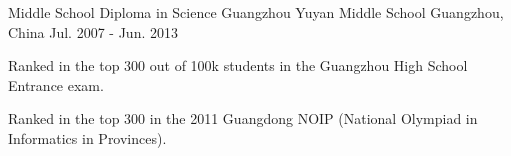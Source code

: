 \begin{cventries}
  \cventry
    {Middle School Diploma in Science} %
    {Guangzhou Yuyan Middle School} %
    {Guangzhou, China} %
    {Jul. 2007 - Jun. 2013} %
    {
      \begin{cvitems} %
        \item {Ranked in the top 300 out of 100k students in the Guangzhou High School Entrance exam.}
        \item {Ranked in the top 300 in the 2011 Guangdong NOIP (National Olympiad in Informatics in Provinces).}
      \end{cvitems}
    }

\end{cventries}
